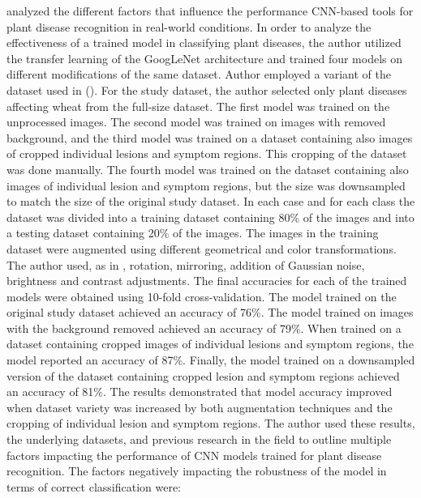 \documentclass{BachelorBUI}
\begin{document}
\textcite{Barbedo:2018:2} analyzed the different factors that influence the performance CNN-based tools for plant disease recognition in real-world conditions. In order to analyze the effectiveness of a trained model in classifying plant diseases, the author utilized the transfer learning of the GoogLeNet architecture and trained four models on different modifications of the same dataset. Author employed a variant of the dataset used in (\cite{Barbedo:2018:1}). For the study dataset, the author selected only plant diseases affecting wheat from the full-size dataset. The first model was trained on the unprocessed images. The second model was trained on images with removed background, and the third model was trained on a dataset containing also images of cropped individual lesions and symptom regions. This cropping of the dataset was done manually. The fourth model was trained on the dataset containing also images of individual lesion and symptom regions, but the size was downsampled to match the size of the original study dataset. In each case and for each class the dataset was divided into a training dataset containing 80\% of the images and into a testing dataset containing 20\% of the images. The images in the training dataset were augmented using different geometrical and color transformations. The author used, as in \cite{Barbedo:2018:1}, rotation, mirroring, addition of Gaussian noise, brightness and contrast adjustments. The final accuracies for each of the trained models were obtained using 10-fold cross-validation. The model trained on the original study dataset achieved an accuracy of 76\%. The model trained on images with the background removed achieved an accuracy of 79\%. When trained on a dataset containing cropped images of individual lesions and symptom regions, the model reported an accuracy of 87\%. Finally, the model trained on a downsampled version of the dataset containing cropped lesion and symptom regions achieved an accuracy of 81\%. The results demonstrated that model accuracy improved when dataset variety was increased by both augmentation techniques and the cropping of individual lesion and symptom regions. The author used these results, the underlying datasets, and previous research in the field to outline multiple factors impacting the performance of CNN models trained for plant disease recognition. The factors negatively impacting the robustness of the model in terms of correct classification were: 
\end{document}
